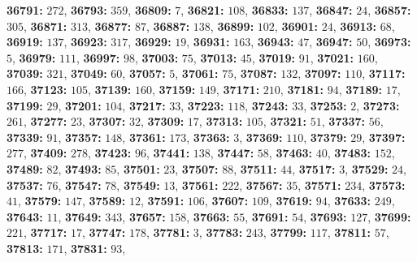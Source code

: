 \textsf{\bfseries 36791:} $272$, \textsf{\bfseries 36793:} $359$, \textsf{\bfseries 36809:} $7$, \textsf{\bfseries 36821:} $108$, \textsf{\bfseries 36833:} $137$, \textsf{\bfseries 36847:} $24$, \textsf{\bfseries 36857:} $305$, \textsf{\bfseries 36871:} $313$, \textsf{\bfseries 36877:} $87$, \textsf{\bfseries 36887:} $138$, \textsf{\bfseries 36899:} $102$, \textsf{\bfseries 36901:} $24$, \textsf{\bfseries 36913:} $68$, \textsf{\bfseries 36919:} $137$, \textsf{\bfseries 36923:} $317$, \textsf{\bfseries 36929:} $19$, \textsf{\bfseries 36931:} $163$, \textsf{\bfseries 36943:} $47$, \textsf{\bfseries 36947:} $50$, \textsf{\bfseries 36973:} $5$, \textsf{\bfseries 36979:} $111$, \textsf{\bfseries 36997:} $98$, \textsf{\bfseries 37003:} $75$, \textsf{\bfseries 37013:} $45$, \textsf{\bfseries 37019:} $91$, \textsf{\bfseries 37021:} $160$, \textsf{\bfseries 37039:} $321$, \textsf{\bfseries 37049:} $60$, \textsf{\bfseries 37057:} $5$, \textsf{\bfseries 37061:} $75$, \textsf{\bfseries 37087:} $132$, \textsf{\bfseries 37097:} $110$, \textsf{\bfseries 37117:} $166$, \textsf{\bfseries 37123:} $105$, \textsf{\bfseries 37139:} $160$, \textsf{\bfseries 37159:} $149$, \textsf{\bfseries 37171:} $210$, \textsf{\bfseries 37181:} $94$, \textsf{\bfseries 37189:} $17$, \textsf{\bfseries 37199:} $29$, \textsf{\bfseries 37201:} $104$, \textsf{\bfseries 37217:} $33$, \textsf{\bfseries 37223:} $118$, \textsf{\bfseries 37243:} $33$, \textsf{\bfseries 37253:} $2$, \textsf{\bfseries 37273:} $261$, \textsf{\bfseries 37277:} $23$, \textsf{\bfseries 37307:} $32$, \textsf{\bfseries 37309:} $17$, \textsf{\bfseries 37313:} $105$, \textsf{\bfseries 37321:} $51$, \textsf{\bfseries 37337:} $56$, \textsf{\bfseries 37339:} $91$, \textsf{\bfseries 37357:} $148$, \textsf{\bfseries 37361:} $173$, \textsf{\bfseries 37363:} $3$, \textsf{\bfseries 37369:} $110$, \textsf{\bfseries 37379:} $29$, \textsf{\bfseries 37397:} $277$, \textsf{\bfseries 37409:} $278$, \textsf{\bfseries 37423:} $96$, \textsf{\bfseries 37441:} $138$, \textsf{\bfseries 37447:} $58$, \textsf{\bfseries 37463:} $40$, \textsf{\bfseries 37483:} $152$, \textsf{\bfseries 37489:} $82$, \textsf{\bfseries 37493:} $85$, \textsf{\bfseries 37501:} $23$, \textsf{\bfseries 37507:} $88$, \textsf{\bfseries 37511:} $44$, \textsf{\bfseries 37517:} $3$, \textsf{\bfseries 37529:} $24$, \textsf{\bfseries 37537:} $76$, \textsf{\bfseries 37547:} $78$, \textsf{\bfseries 37549:} $13$, \textsf{\bfseries 37561:} $222$, \textsf{\bfseries 37567:} $35$, \textsf{\bfseries 37571:} $234$, \textsf{\bfseries 37573:} $41$, \textsf{\bfseries 37579:} $147$, \textsf{\bfseries 37589:} $12$, \textsf{\bfseries 37591:} $106$, \textsf{\bfseries 37607:} $109$, \textsf{\bfseries 37619:} $94$, \textsf{\bfseries 37633:} $249$, \textsf{\bfseries 37643:} $11$, \textsf{\bfseries 37649:} $343$, \textsf{\bfseries 37657:} $158$, \textsf{\bfseries 37663:} $55$, \textsf{\bfseries 37691:} $54$, \textsf{\bfseries 37693:} $127$, \textsf{\bfseries 37699:} $221$, \textsf{\bfseries 37717:} $17$, \textsf{\bfseries 37747:} $178$, \textsf{\bfseries 37781:} $3$, \textsf{\bfseries 37783:} $243$, \textsf{\bfseries 37799:} $117$, \textsf{\bfseries 37811:} $57$, \textsf{\bfseries 37813:} $171$, \textsf{\bfseries 37831:} $93$, 
